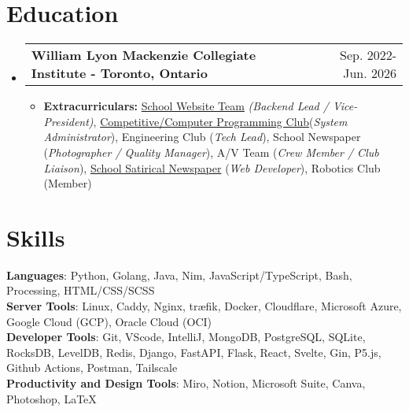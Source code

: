 \documentclass[letterpaper,11pt]{article}
\makeatletter
\newcommand{\resumeItem}[1]{
    \item\small{
            {#1 \vspace{-2pt}}
    }
}
\newcommand{\shortResumeSubheading}[2]{%
    \vspace{-2pt}\item
    \begin{tabular*}{0.97\textwidth}[t]{@{}l@{\extracolsep{\fill}}r@{}}
        \textbf{#1} & #2 \\
    \end{tabular*}\vspace{-7pt}%
}
\newcommand{\resumeSubHeadingListStart}{\begin{itemize}[leftmargin=0.15in, label={}]}
\newcommand{\resumeSubHeadingListEnd}{\end{itemize}}
\newcommand{\resumeItemListStart}{\begin{itemize}}
\newcommand{\resumeItemListEnd}{\end{itemize}\vspace{-5pt}}
\makeatother
\begin{document}
\section{Education}
\resumeSubHeadingListStart
\shortResumeSubheading
{William Lyon Mackenzie Collegiate Institute - Toronto, Ontario}{Sep. 2022- Jun. 2026}
\resumeItemListStart
\resumeItem{\textbf{Extracurriculars: }\href{https://maclyonsden.com}{School Website Team}  \emph{(Backend Lead / Vice-President)}, \href{https://mcpt.ca}{Competitive/Computer Programming Club}{(\emph{System Administrator})}, Engineering Club (\emph{Tech Lead}), School Newspaper (\emph{Photographer / Quality Manager}), A/V Team (\emph{Crew Member / Club Liaison}), \href{https://flounder.news}{School Satirical Newspaper} (\emph{Web Developer}), Robotics Club (Member)}
\resumeItemListEnd
\resumeSubHeadingListEnd


\section{Skills}
\small{

\textbf{Languages}{: Python, Golang, Java, Nim, JavaScript/TypeScript, Bash, Processing, HTML/CSS/SCSS} \\
\textbf{Server Tools}{: Linux, Caddy, Nginx, træfik, Docker, Cloudflare, Microsoft Azure, Google Cloud (GCP), Oracle Cloud (OCI)} \\
\textbf{Developer Tools}{: Git, VScode, IntelliJ, MongoDB, PostgreSQL, SQLite, RocksDB, LevelDB, Redis, Django, FastAPI, Flask, React, Svelte, Gin, P5.js, Github Actions, Postman, Tailscale} \\
\textbf{Productivity and Design Tools}{: Miro, Notion, Microsoft Suite, Canva, Photoshop, LaTeX} \\
}
\end{document}
